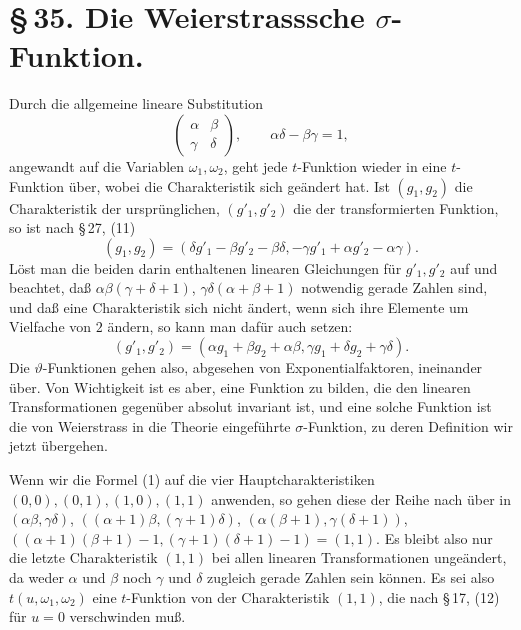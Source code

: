 \documentclass[11pt]{article}
\begin{document}
\section*{\S\,35. Die Weierstrasssche $\sigma$-Funktion.}

Durch die allgemeine lineare Substitution
\[
\begin{pmatrix}\alpha&\beta\\ \gamma&\delta\end{pmatrix},
\qquad \alpha\delta-\beta\gamma=1,
\]
angewandt auf die Variablen $\omega_1,\omega_2$, geht jede $t$-Funktion wieder in eine $t$-Funktion über, wobei die Charakteristik sich geändert hat. Ist $(g_1,g_2)$ die Charakteristik der ursprünglichen, $(g'_1,g'_2)$ die der transformierten Funktion, so ist nach \S\,27, (11)
\[
(g_1,g_2)=(\delta g'_1-\beta g'_2-\beta\delta,
-\gamma g'_1+\alpha g'_2-\alpha\gamma).
\]
Löst man die beiden darin enthaltenen linearen Gleichungen für $g'_1,g'_2$ auf und beachtet, daß $\alpha\beta(\gamma+\delta+1)$, $\gamma\delta(\alpha+\beta+1)$ notwendig gerade Zahlen sind, und daß eine Charakteristik sich nicht ändert, wenn sich ihre Elemente um Vielfache von $2$ ändern, so kann man dafür auch setzen:
\begin{equation}
(g'_1,g'_2)=(\alpha g_1+\beta g_2+\alpha\beta,
\gamma g_1+\delta g_2+\gamma\delta). \tag{1}
\end{equation}
Die $\vartheta$-Funktionen gehen also, abgesehen von Exponentialfaktoren, ineinander über. Von Wichtigkeit ist es aber, eine Funktion zu bilden, die den linearen Transformationen gegenüber absolut invariant ist, und eine solche Funktion ist die von Weierstrass in die Theorie eingeführte $\sigma$-Funktion, zu deren Definition wir jetzt übergehen.

Wenn wir die Formel (1) auf die vier Hauptcharakteristiken $(0,0),(0,1),(1,0),(1,1)$ anwenden, so gehen diese der Reihe nach über in $(\alpha\beta,\gamma\delta)$, $((\alpha+1)\beta,(\gamma+1)\delta)$, $(\alpha(\beta+1),\gamma(\delta+1))$, $((\alpha+1)(\beta+1)-1,(\gamma+1)(\delta+1)-1)=(1,1)$. Es bleibt also nur die letzte Charakteristik $(1,1)$ bei allen linearen Transformationen ungeändert, da weder $\alpha$ und $\beta$ noch $\gamma$ und $\delta$ zugleich gerade Zahlen sein können. Es sei also $t(u,\omega_1,\omega_2)$ eine $t$-Funktion von der Charakteristik $(1,1)$, die nach \S\,17, (12) für $u=0$ verschwinden muß.
\end{document}
